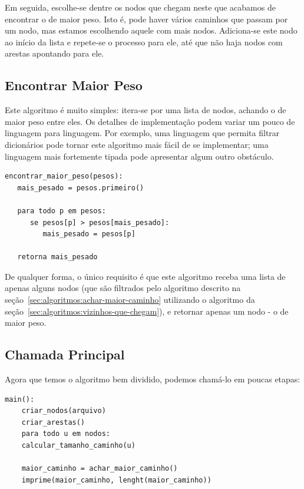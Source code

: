\documentclass[12pt]{article}
\begin{document}
Em seguida, escolhe-se dentre os nodos que chegam neste que acabamos de encontrar o de maior peso. Isto é, pode haver vários caminhos que passam por um nodo, mas estamos escolhendo aquele com mais nodos. Adiciona-se este nodo ao início da lista e repete-se o processo para ele, até que não haja nodos com arestas apontando para ele.


\subsection{Encontrar Maior Peso}\label{sec:algoritmos:encontrar-maior-peso}
Este algoritmo é muito simples: itera-se por uma lista de nodos, achando o de maior peso entre eles. Os detalhes de implementa\c{c}ão podem variar um pouco de linguagem para linguagem. Por exemplo, uma linguagem que permita filtrar dicionários pode tornar este algoritmo mais fácil de se implementar; uma linguagem mais fortemente tipada pode apresentar algum outro obstáculo.

\begin{lstlisting}
encontrar_maior_peso(pesos):
   mais_pesado = pesos.primeiro()

   para todo p em pesos:
      se pesos[p] > pesos[mais_pesado]:
         mais_pesado = pesos[p]

   retorna mais_pesado
\end{lstlisting}

De qualquer forma, o único requisito é que este algoritmo receba uma lista de apenas alguns nodos (que são filtrados pelo algoritmo descrito na se\c{c}ão~\ref{sec:algoritmos:achar-maior-caminho} utilizando o algoritmo da se\c{c}ão~\ref{sec:algoritmos:vizinhos-que-chegam}), e retornar apenas um nodo - o de maior peso.

\subsection{Chamada Principal}\label{sec:algoritmos:main}
Agora que temos o algoritmo bem dividido, podemos chamá-lo em poucas etapas:

\begin{lstlisting}
main():
    criar_nodos(arquivo)
    criar_arestas()
    para todo u em nodos:
    calcular_tamanho_caminho(u)

    maior_caminho = achar_maior_caminho()
    imprime(maior_caminho, lenght(maior_caminho))
\end{lstlisting}
\end{document}
